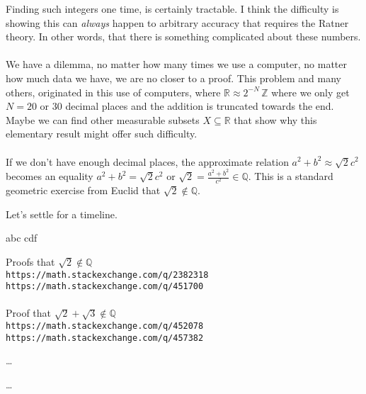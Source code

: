 \documentclass[12pt]{article}
\begin{document}
Finding such integers one time, is certainly tractable.  I think the difficulty is showing this can \textit{always} happen to arbitrary accuracy that requires the Ratner theory.  In other words, that there is something complicated about these numbers. \\ \\ 
We have a dilemma, no matter how many times we use a computer, no matter how much data we have, we are no closer to a proof.  This problem and many others, originated in this use of computers, where $\mathbb{R}\approx 2^{-N}\,\mathbb{Z}$ where we only get $N = 20$ or $30$ decimal places and the addition is truncated towards the end. Maybe we can find other measurable subsets $X \subseteq \mathbb{R}$ that show why this elementary result might offer such difficulty.   \\ \\
If we don't have enough decimal places, the approximate relation $a^2 + b^2 \approx \sqrt{2}c^2$ becomes an equality $a^2 + b^2 \mathbf{=} \sqrt{2}c^2$ or $\sqrt{2} = \frac{a^2+b^2}{c^2} \in \mathbb{Q}$.  This is a standard geometric exercise from Euclid that $\sqrt{2} \notin \mathbb{Q}$.

\newpage \noindent
Let's settle for a timeline.  
\begin{multicols}{2}
\noindent abc \vfill \null \columnbreak
\noindent cdf
\end{multicols}

\begin{thebibliography}{} 
\item Proofs that $\sqrt{2}\notin\mathbb{Q}$ \\
\texttt{https://math.stackexchange.com/q/2382318}\\
\texttt{https://math.stackexchange.com/q/451700} \\ \\ 
Proof that $\sqrt{2}+\sqrt{3} \notin \mathbb{Q}$ \\
\texttt{https://math.stackexchange.com/q/452078}\\ 
\texttt{https://math.stackexchange.com/q/457382}
\item \dots
\item \dots
\end{thebibliography}
\end{document}
